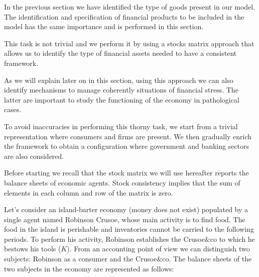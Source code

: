 \documentclass{article}
\begin{document}
In the previous section we have identified the type of goods present in our model. The identification and specification of financial products to be included in the model has the same importance and is performed in this section. 

This task is not trivial and we perform it by using  
a stocks matrix approach that allows us to identify the type of financial assets needed to have a consistent framework. 

As we will explain later on in this section, using this approach we can also identify mechanisms to manage coherently situations of financial stress. The latter are important to study the functioning of the economy in pathological cases.  

To avoid inaccuracies in performing this thorny task, we start from a trivial representation where consumers and firms are present. We then gradually enrich the framework to obtain a configuration where government and banking sectors are also considered.

Before starting we recall that the stock matrix we will use hereafter reports the balance sheets of economic agents. 
Stock consistency implies that the sum of elements in each column and row of the matrix is zero.  


Let's consider an island-barter economy (money does not exist) populated by a single agent named Robinson Crusoe, whose main activity is to find food. 
The food in the island is perishable and inventories cannot be carried to the following periods. To perform his activity, Robinson establishes the Crusoe\&co to which he bestows his tools ($K$). From an accounting point of view we can distinguish two subjects: Robinson as a consumer and the Crusoe\&co. The balance sheets of the two subjects in the economy are represented as follows:
\end{document}
